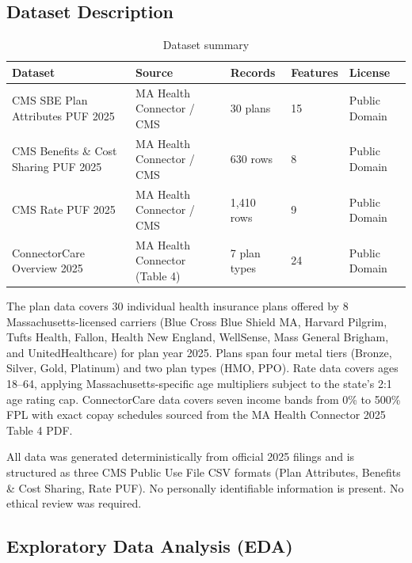 \documentclass[12pt, letterpaper]{article}
\begin{document}
\subsection{Dataset Description}

\begin{table}[H]
  \centering
  \caption{Dataset summary}
  \label{tab:dataset}
  \begin{tabularx}{\linewidth}{lXlll}
    \toprule
    \textbf{Dataset} & \textbf{Source} & \textbf{Records} & \textbf{Features} & \textbf{License} \\
    \midrule
    CMS SBE Plan Attributes PUF 2025 & MA Health Connector / CMS & 30 plans & 15 & Public Domain \\
    CMS Benefits \& Cost Sharing PUF 2025 & MA Health Connector / CMS & 630 rows & 8 & Public Domain \\
    CMS Rate PUF 2025 & MA Health Connector / CMS & 1,410 rows & 9 & Public Domain \\
    ConnectorCare Overview 2025 & MA Health Connector (Table 4) & 7 plan types & 24 & Public Domain \\
    \bottomrule
  \end{tabularx}
\end{table}

The plan data covers 30 individual health insurance plans offered by 8 Massachusetts-licensed carriers (Blue Cross Blue Shield MA, Harvard Pilgrim, Tufts Health, Fallon, Health New England, WellSense, Mass General Brigham, and UnitedHealthcare) for plan year 2025. Plans span four metal tiers (Bronze, Silver, Gold, Platinum) and two plan types (HMO, PPO). Rate data covers ages 18--64, applying Massachusetts-specific age multipliers subject to the state's 2:1 age rating cap. ConnectorCare data covers seven income bands from 0\% to 500\% FPL with exact copay schedules sourced from the MA Health Connector 2025 Table 4 PDF.

All data was generated deterministically from official 2025 filings and is structured as three CMS Public Use File CSV formats (Plan Attributes, Benefits \& Cost Sharing, Rate PUF). No personally identifiable information is present. No ethical review was required.

\subsection{Exploratory Data Analysis (EDA)}
\end{document}
